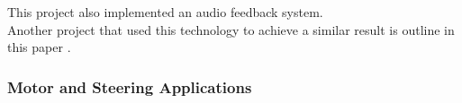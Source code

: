 \noindent This project also implemented an audio feedback system. \\

\noindent Another project that used this technology to achieve a similar result is outline in this paper \cite{CVRef2}. \\



\subsubsection{Motor and Steering Applications} 

